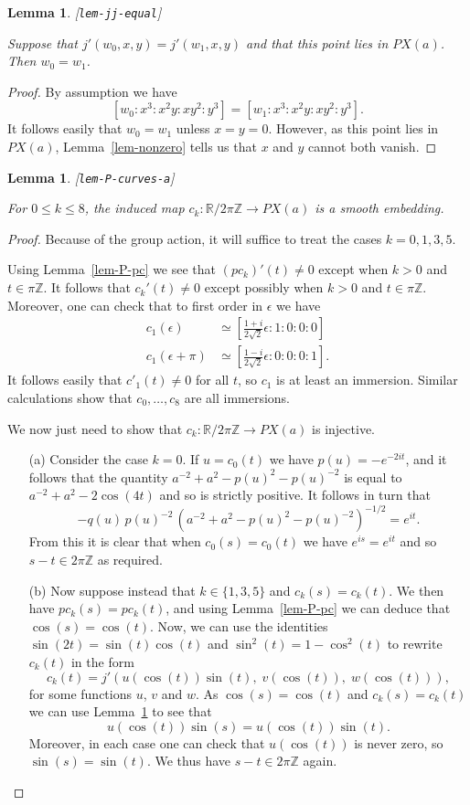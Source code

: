 \documentclass[reqno]{amsart}
\newcommand{\lbl}[1]{\label{#1}\textup{[\texttt{#1}]}\par}
\newcommand{\lbl}{\label}
\newcommand{\ep}        {\epsilon}
\newcommand{\Z}         {{\mathbb{Z}}}
\newcommand{\R}         {{\mathbb{R}}}
\newcommand{\rt}        {\sqrt{2}}
\renewcommand{\:}{\colon}
\newtheorem{lemma}[theorem]{Lemma}
\theoremstyle{definition}
\begin{document}
\begin{lemma}\lbl{lem-jj-equal}
 Suppose that $j'(w_0,x,y)=j'(w_1,x,y)$ and that this point lies in
 $PX(a)$.  Then $w_0=w_1$.
\end{lemma}
\begin{proof}
 By assumption we have
 \[ [w_0:x^3:x^2y:xy^2:y^3]=[w_1:x^3:x^2y:xy^2:y^3]. \]
 It follows easily that $w_0=w_1$ unless $x=y=0$.  However, as this
 point lies in $PX(a)$, Lemma~\ref{lem-nonzero} tells us that $x$ and
 $y$ cannot both vanish.
\end{proof}

\begin{lemma}\lbl{lem-P-curves-a}
 For $0\leq k\leq 8$, the induced map $c_k\:\R/2\pi\Z\to PX(a)$ is a
 smooth embedding.
\end{lemma}
\begin{proof}
 Because of the group action, it will suffice to treat the cases
 $k=0,1,3,5$.

 Using Lemma~\ref{lem-P-pc} we see that $(pc_k)'(t)\neq 0$ except
 when $k>0$ and $t\in\pi\Z$.  It follows that $c_k'(t)\neq 0$ except
 possibly when $k>0$ and $t\in\pi\Z$.  Moreover, one can check that to
 first order in $\ep$ we have
 \begin{align*}
  c_1(\ep)     &\simeq \left[\frac{1+i}{2\rt}\ep:1:0:0:0\right] \\
  c_1(\ep+\pi) &\simeq \left[\frac{1-i}{2\rt}\ep:0:0:0:1\right].
 \end{align*}
 It follows easily that $c'_1(t)\neq 0$ for all $t$, so $c_1$ is at
 least an immersion.  Similar calculations show that $c_0,\dotsc,c_8$
 are all immersions.

 We now just need to show that $c_k\:\R/2\pi\Z\to PX(a)$ is
 injective.
 \begin{itemize}
  \item[(a)] Consider the case $k=0$.  If $u=c_0(t)$ we have
   $p(u)=-e^{-2it}$, and it follows that the quantity
   $a^{-2}+a^2-p(u)^2-p(u)^{-2}$ is equal to $a^{-2}+a^2-2\cos(4t)$
   and so is strictly positive.  It follows in turn that
   \[ -q(u)\,p(u)^{-2}\,(a^{-2}+a^2-p(u)^2-p(u)^{-2})^{-1/2} = e^{it}.
   \]
   From this it is clear that when $c_0(s)=c_0(t)$ we have
   $e^{is}=e^{it}$ and so $s-t\in 2\pi\Z$ as required.
  \item[(b)] Now suppose instead that $k\in\{1,3,5\}$ and
   $c_k(s)=c_k(t)$.  We then have $pc_k(s)=pc_k(t)$, and using
   Lemma~\ref{lem-P-pc} we can deduce that $\cos(s)=\cos(t)$.  Now, we
   can use the identities $\sin(2t)=\sin(t)\cos(t)$ and
   $\sin^2(t)=1-\cos^2(t)$ to rewrite $c_k(t)$ in the form 
   \[ c_k(t)=j'(u(\cos(t))\sin(t),\;v(\cos(t)),\;w(\cos(t))), \]
   for some functions $u$, $v$ and $w$.  As
   $\cos(s)=\cos(t)$ and $c_k(s)=c_k(t)$ we can use
   Lemma~\ref{lem-jj-equal} to see that
   \[ u(\cos(t))\sin(s) = u(\cos(t))\sin(t). \]
   Moreover, in each case one can check that $u(\cos(t))$ is never
   zero, so $\sin(s)=\sin(t)$.  We thus have $s-t\in 2\pi\Z$ again.
 \end{itemize}
\end{proof}
\end{document}
